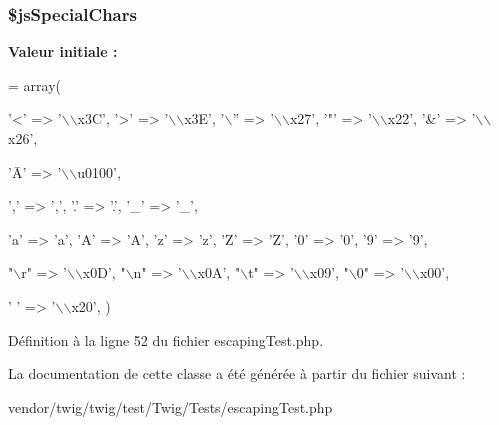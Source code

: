 \subsubsection[{\texorpdfstring{\$js\+Special\+Chars}{$jsSpecialChars}}]{\setlength{\rightskip}{0pt plus 5cm}\$js\+Special\+Chars\hspace{0.3cm}{\ttfamily [protected]}}\hypertarget{class_twig___test___escaping_test_afe1c79a3229f707f9c3866c6911b7115}{}\label{class_twig___test___escaping_test_afe1c79a3229f707f9c3866c6911b7115}
{\bfseries Valeur initiale \+:}
\begin{DoxyCode}
= array(
        
        \textcolor{charliteral}{'<'} => \textcolor{stringliteral}{'\(\backslash\)\(\backslash\)x3C'},
        \textcolor{charliteral}{'>'} => \textcolor{stringliteral}{'\(\backslash\)\(\backslash\)x3E'},
        \textcolor{charliteral}{'\(\backslash\)''} => \textcolor{stringliteral}{'\(\backslash\)\(\backslash\)x27'},
        \textcolor{charliteral}{'"'} => \textcolor{stringliteral}{'\(\backslash\)\(\backslash\)x22'},
        \textcolor{charliteral}{'&'} => \textcolor{stringliteral}{'\(\backslash\)\(\backslash\)x26'},
        
        \textcolor{stringliteral}{'Ā'} => \textcolor{stringliteral}{'\(\backslash\)\(\backslash\)u0100'},
        
        \textcolor{charliteral}{','} => \textcolor{charliteral}{','},
        \textcolor{charliteral}{'.'} => \textcolor{charliteral}{'.'},
        \textcolor{charliteral}{'\_'} => \textcolor{charliteral}{'\_'},
        
        \textcolor{charliteral}{'a'} => \textcolor{charliteral}{'a'},
        \textcolor{charliteral}{'A'} => \textcolor{charliteral}{'A'},
        \textcolor{charliteral}{'z'} => \textcolor{charliteral}{'z'},
        \textcolor{charliteral}{'Z'} => \textcolor{charliteral}{'Z'},
        \textcolor{charliteral}{'0'} => \textcolor{charliteral}{'0'},
        \textcolor{charliteral}{'9'} => \textcolor{charliteral}{'9'},
        
        \textcolor{stringliteral}{"\(\backslash\)r"} => \textcolor{stringliteral}{'\(\backslash\)\(\backslash\)x0D'},
        \textcolor{stringliteral}{"\(\backslash\)n"} => \textcolor{stringliteral}{'\(\backslash\)\(\backslash\)x0A'},
        \textcolor{stringliteral}{"\(\backslash\)t"} => \textcolor{stringliteral}{'\(\backslash\)\(\backslash\)x09'},
        \textcolor{stringliteral}{"\(\backslash\)0"} => \textcolor{stringliteral}{'\(\backslash\)\(\backslash\)x00'},
        
        \textcolor{charliteral}{' '} => \textcolor{stringliteral}{'\(\backslash\)\(\backslash\)x20'},
    )
\end{DoxyCode}


Définition à la ligne 52 du fichier escaping\+Test.\+php.



La documentation de cette classe a été générée à partir du fichier suivant \+:\begin{DoxyCompactItemize}
\item 
vendor/twig/twig/test/\+Twig/\+Tests/escaping\+Test.\+php\end{DoxyCompactItemize}
